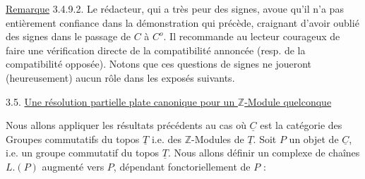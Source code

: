 \underline{Remarque} 3.4.9.2. Le rédacteur, qui a très peur des signes, avoue qu'il n'a pas entièrement confiance dans la démonstration qui précède, craignant d'avoir oublié des signes dans le passage de $C$ à $C^o$. Il recommande au lecteur courageux de faire une vérification directe de la compatibilité annoncée (resp. de la compatibilité opposée). Notons que ces questions de signes ne joueront (heureusement) aucun rôle dans les exposés suivants.


3.5. \underline{Une résolution partielle plate canonique pour un $\mathbb{Z}$-Module quelconque}

Nous allons appliquer les résultats précédents au cas où $\underline{C}$ est la catégorie des Groupes commutatifs du topos $\underline{T}$ i.e. des $\mathbb{Z}$-Modules de $\underline{T}$. Soit $P$ un objet de $\underline{C}$, i.e. un groupe commutatif du topos $\underline{T}$. Nous allons définir un complexe de chaînes $L.(P)$ augmenté vers $P$, dépendant fonctoriellement de $P$ :



